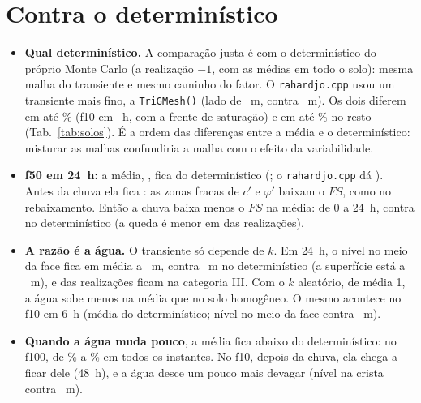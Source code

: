 \documentclass[11pt,a4paper]{article}
\begin{document}
\section{Contra o determinístico}\label{sec:det}
\begin{itemize}
\item \textbf{Qual determinístico.} A comparação justa é com o determinístico do próprio Monte Carlo (a realização
$-1$, com as médias em todo o solo): mesma malha do transiente e mesmo caminho do fator. O \texttt{rahardjo.cpp} usou
um transiente mais fino, a \texttt{TriGMesh(\RefRahardjo)} (lado de \LadoRahardjo~m, contra \LadoTrans~m). Os dois
diferem em até \DifLogMaxDez\% (f10 em \DifLogMaxTDez~h, com a frente de saturação) e em até \DifLogResto\% no resto
(Tab.~\ref{tab:solos}). É a ordem das diferenças entre a média e o determinístico: misturar as malhas confundiria a
malha com o efeito da variabilidade.
\item \textbf{f50 em 24~h:} a média, \MediaCinquentaVinteQuatro, fica \PosCinquentaVinteQuatro{} do determinístico
(\DetCinquentaVinteQuatro; o \texttt{rahardjo.cpp} dá \LogCinquentaVinteQuatro). Antes da chuva ela fica
\PosCinquentaZero: as zonas fracas de $c'$ e $\varphi'$ baixam o $FS$, como no rebaixamento. Então a
chuva baixa menos o $FS$ na média: \QuedaMedia{} de 0 a 24~h, contra \QuedaDet{} no determinístico (a queda é menor em
\QuedaMenor{} das \NCinquenta{} realizações).
\item \textbf{A razão é a água.} O transiente só depende de $k$. Em 24~h, o nível no meio da face fica em média a
\NivelMeio~m, contra \NivelMeioDet~m no determinístico (a superfície está a \CotaMeio~m), e \CatTres{} das
\NMec{} realizações ficam na categoria III. Com o $k$ aleatório, de média 1, a água sobe menos na média que no solo
homogêneo. O mesmo acontece no f10 em 6~h (média \PosDezSeis{} do determinístico; nível no meio da face
\NivelMeioDezSeis{} contra \NivelDetMeioDezSeis~m).
\item \textbf{Quando a água muda pouco}, a média fica abaixo do determinístico: no f100, de \DifFaixaMinCem\% a
\DifFaixaMaxCem\% em todos os instantes. No f10, depois da chuva, ela chega a ficar \PosDezQuarentaOito{} dele
(48~h), e a água desce um pouco mais devagar (nível na crista \NivelCristaDezQuarentaOito{} contra
\NivelDetCristaDezQuarentaOito~m).
\end{itemize}
\end{document}
